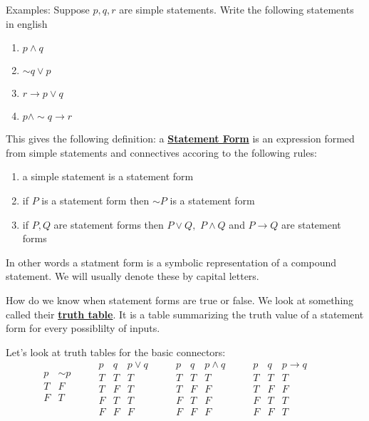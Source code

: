 \documentclass[14,fleqn]{article}
\newcommand{\defn}[1]{\textbf{\underline{#1}}}
\begin{document}
Examples: Suppose $p,q,r$ are simple statements. Write the following statements in english
\begin{enumerate}
	\item $p\wedge q$
	\item $\sim q \vee p$
	\item $r\to p\vee q$
	\item $p \wedge \sim q \to r$
\end{enumerate}

This gives the following definition: a \defn{Statement Form} is an expression formed from simple statements and connectives accoring to the following rules:
\begin{enumerate}
	\item a simple statement is a statement form
	\item if $P$ is a statement form then $\sim P$ is a statement form
	\item if $P,Q$ are statement forms then $P\vee Q,$ $P\wedge Q$ and $P\to Q$ are statement forms
\end{enumerate}
In other words a statment form is a symbolic representation of a compound statement. We will usually denote these by capital letters.

How do we know when statement forms are true or false. We look at something called their \defn{truth table}. It is a table summarizing the truth value of a statement form for every possiblilty of inputs.

Let's look at truth tables for the basic connectors:
\[
	\begin{array}{c|c}
		p&\sim p\\\hline
		T&F\\
		F&T\\
	\end{array}\qquad
	\begin{array}{c|c|c}
		p&q&p\vee q\\\hline
		T&T&T\\
		T&F&T\\
		F&T&T\\
		F&F&F
	\end{array}\qquad
	\begin{array}{c|c|c}
		p&q&p\wedge q\\\hline
		T&T&T\\
		T&F&F\\
		F&T&F\\
		F&F&F
	\end{array}\qquad
	\begin{array}{c|c|c}
		p&q&p\to q\\\hline
		T&T&T\\
		T&F&F\\
		F&T&T\\
		F&F&T
	\end{array}\qquad
\]
\end{document}
